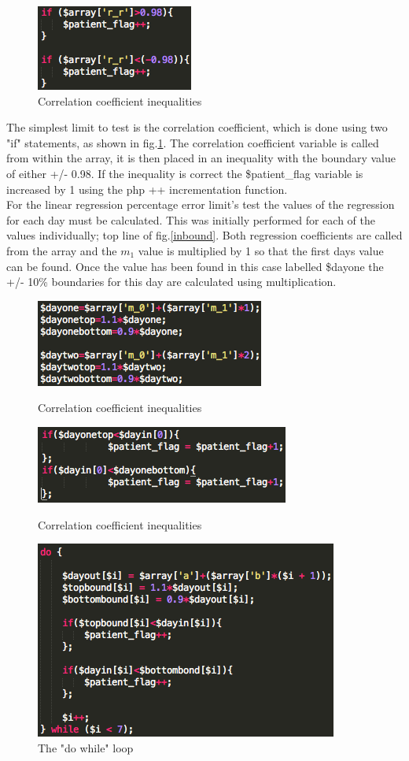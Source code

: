 \documentclass[11pt]{article}
\begin{document}
\begin{figure}
\centering
\includegraphics[scale=0.6]{corrcheck}
\caption{Correlation coefficient inequalities \label{corrcheck}} 
\end{figure} 
The simplest limit to test is the correlation coefficient, which is done using two "if" statements, as shown in fig.\ref{corrcheck}. The correlation coefficient variable is called from within the array, it is then placed in an inequality with the boundary value of either +/- 0.98. If the inequality is correct the \$patient\_flag variable is increased by 1 using the php ++ incrementation function.
\\ \indent
For the linear regression percentage error limit's test the values of the regression for each day must be calculated. This was initially performed for each of the values individually; top line of fig.\ref{inbound}. Both regression coefficients are called from the array and the $m_1$ value is multiplied by 1 so that the first days value can be found. Once the value has been found in this case labelled \$dayone the +/- 10\% boundaries for this day are calculated using multiplication. 
\begin{figure}
\centering
\includegraphics[scale=0.6]{linbound}
\caption{Correlation coefficient inequalities \label{inbound}} 
\includegraphics[scale=0.6]{boundtest1}
\caption{Correlation coefficient inequalities} 
\includegraphics[scale=0.6]{dowhile}
\caption{The "do while" loop \label{dowhile}} 
\end{figure} 
\end{document}
